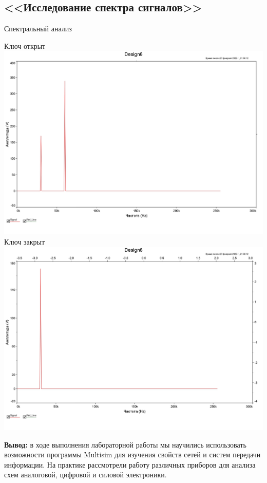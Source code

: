 \documentclass[11pt]{article}
\begin{document}
\subsection{<<Исследование спектра сигналов>>}
Спектральный анализ
\begin{center}
    Ключ открыт
    \includegraphics[width=1\linewidth]{6/graph_key_open.jpg}
    Ключ закрыт
    \includegraphics[width=1\linewidth]{6/graph_key_closed.jpg}
\end{center}
\textbf{Вывод:} в ходе выполнения лабораторной работы мы научились использовать возможности программы Multisim для изучения свойств сетей и систем передачи информации. На практике рассмотрели работу различных приборов для анализа схем аналоговой, цифровой и силовой электроники.
\end{document}
